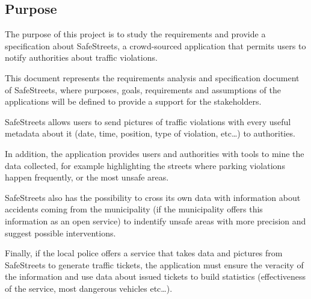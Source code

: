 \subsection{Purpose}
The purpose of this project is to study the requirements and provide a specification about SafeStreets, a crowd-sourced application that permits users to notify authorities about traffic violations. \newline\par
This document represents the requirements analysis and specification document of SafeStreets, where purposes, goals, requirements and assumptions of the applications will be defined to provide a support for the stakeholders. \newline\par
SafeStreets allows users to send pictures of traffic violations with every useful metadata about it (date, time, position, type of violation, etc…) to authorities. \newline\par
In addition, the application provides users and authorities with tools to mine the data collected, for example highlighting the streets where parking violations happen frequently, or the most unsafe areas. \newline\par
SafeStreets also has the possibility to cross its own data with information about accidents coming from the municipality (if the municipality offers this information as an open service) to indentify unsafe areas with more precision and suggest possible interventions. \newline\par
Finally, if the local police offers a service that takes data and pictures from SafeStreets to generate traffic tickets, the application must ensure the veracity of the information and use data about issued tickets to build statistics (effectiveness of the service, most dangerous vehicles etc…). 
